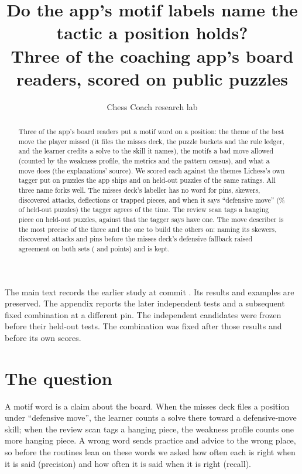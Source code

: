 \documentclass[11pt]{article}
\title{Do the app's motif labels name the tactic a position holds?\\[0.3em]
\large Three of the coaching app's board readers, scored on public puzzles}
\author{Chess Coach research lab}
\date{}
\begin{document}
\maketitle

\noindent The main text records the earlier study at commit \texttt{\AppCommit}.
Its results and examples are preserved. The appendix reports the later
independent tests and a subsequent fixed combination at a different pin. The
independent candidates were frozen before their held-out tests. The combination
was fixed after those results and before its own scores.

\begin{abstract}
Three of the app's board readers put a motif word on a position: the theme of the best move the
player missed (it files the misses deck, the puzzle buckets and the rule ledger, and the learner
credits a solve to the skill it names), the motifs a bad move allowed (counted by the weakness
profile, the metrics and the pattern census), and what a move does (the explanations' source).
We scored each against the themes Lichess's own tagger put on \AppPuzzles{} puzzles the app ships
and on \HeldPuzzles{} held-out puzzles of the same ratings. All three name forks well. The misses
deck's labeller has no word for pins, skewers, discovered attacks, deflections or trapped
pieces, and when it says ``defensive move'' (\DefShareHeld\% of held-out puzzles) the tagger
agrees \DefPrecHeld{} of the time. The review scan tags a hanging piece on \HangSaidHeld{}
held-out puzzles, against \HangRealHeld{} that the tagger says have one. The move describer is
the most precise of the three and the one to build the others on: naming its skewers, discovered
attacks and pins before the misses deck's defensive fallback raised agreement on both sets
(\CandAppAgreeDiff{} and \CandHeldAgreeDiff{} points) and is kept.
\end{abstract}

\section{The question}

A motif word is a claim about the board. When the misses deck files a position under
``defensive move'', the learner counts a solve there toward a defensive-move skill; when the
review scan tags a hanging piece, the weakness profile counts one more hanging piece. A wrong
word sends practice and advice to the wrong place, so before the routines lean on these words
we asked how often each is right when it is said (precision) and how often it is said when it
is right (recall).
\end{document}
